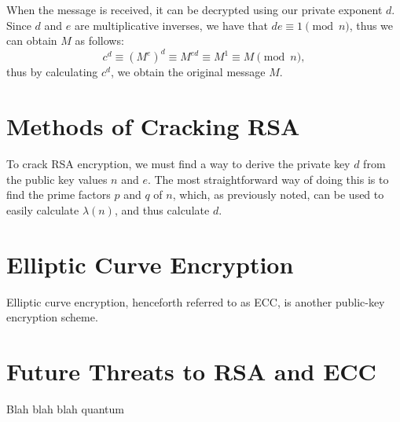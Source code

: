 \documentclass[letterpaper,twocolumn,12pt]{article}
\begin{document}
    When the message is received, it can be decrypted using our private
    exponent \( d \). Since \( d \) and \( e \) are multiplicative inverses,
    we have that \( de \equiv 1 \pmod{n} \), thus we can obtain \( M \) as
    follows:
    \[ c^d \equiv (M^e)^d \equiv M^{ed} \equiv M^1 \equiv M \pmod{n}, \]
    thus by calculating \( c^d \), we obtain the original message \( M \).

    \section*{Methods of Cracking RSA}

    To crack RSA encryption, we must find a way to derive the private key
    \( d \) from the public key values \( n \) and \( e \). The most
    straightforward way of doing this is to find the prime factors \( p \)
    and \( q \) of \( n \), which, as previously noted, can be used to easily
    calculate \( \lambda(n) \), and thus calculate \( d \).

    \section*{Elliptic Curve Encryption}

    Elliptic curve encryption, henceforth referred to as ECC, is another
    public-key encryption scheme.

    \section*{Future Threats to RSA and ECC}

    Blah blah blah quantum

    
    
\end{document}
